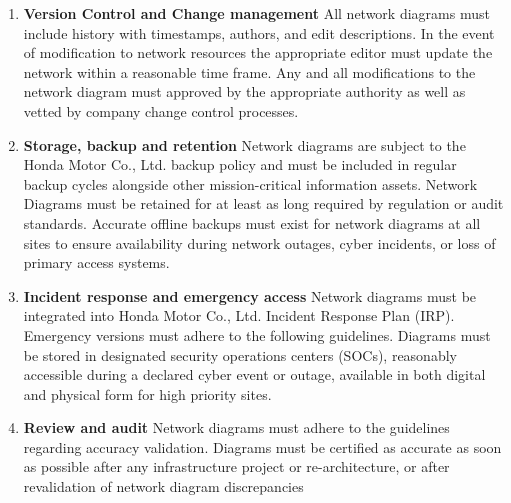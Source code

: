 \begin{enumerate}
    \item \textbf{Version Control and Change management} 
    All network diagrams must include history with timestamps, authors, and edit descriptions. In the event of modification to network resources the appropriate editor must update the network within a reasonable time frame. Any and all modifications to the network diagram must approved by the appropriate authority as well as vetted by company change control processes.
    \item \textbf{Storage, backup and retention}
    Network diagrams are subject to the Honda Motor Co., Ltd. backup policy and must be included in regular backup cycles alongside other mission-critical information assets. Network Diagrams must be retained for at least as long required by regulation or audit standards. Accurate offline backups must exist for network diagrams at all sites to ensure availability during network outages, cyber incidents, or loss of primary access systems.
    \item \textbf{Incident response and emergency access}
    Network diagrams must be integrated into Honda Motor Co., Ltd. Incident Response Plan (IRP). Emergency versions must adhere to the following guidelines. Diagrams must be stored in designated security operations centers (SOCs), reasonably accessible during a declared cyber event or outage, available in both digital and physical form for high priority sites.
    \item \textbf{Review and audit}
    Network diagrams must adhere to the guidelines regarding accuracy validation. Diagrams must be certified as accurate as soon as possible after any infrastructure project or re-architecture, or after revalidation of network diagram discrepancies
\end{enumerate}
